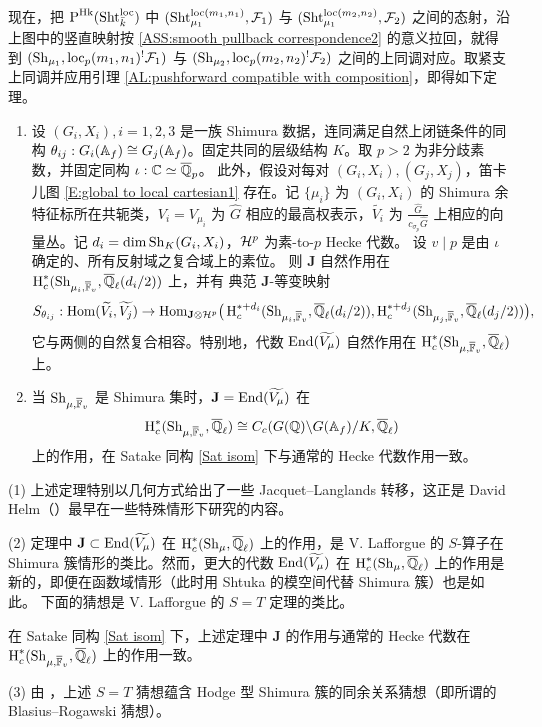 现在，把 $\operatorname{P}^{{\operatorname{Hk}}}(\operatorname{Sht}_{\bar k}^{\mathrm{loc}})$ 中 $(\operatorname{Sht}_{\mu_1}^{\mathrm{loc}(m_1,n_1)},{\mathcal F}_1)$ 与 $(\operatorname{Sht}_{\mu_1}^{\mathrm{loc}(m_2,n_2)},{\mathcal F}_2)$ 之间的态射，沿上图中的竖直映射按 \eqref{ASS:smooth pullback correspondence2} 的意义拉回，就得到 $(\operatorname{Sh}_{\mu_1}, \mathrm{loc}_p(m_1,n_1)^!{\mathcal F}_1)$ 与 $(\operatorname{Sh}_{\mu_2},\mathrm{loc}_p(m_2,n_2)^!{\mathcal F}_2)$ 之间的上同调对应。取紧支上同调并应用引理 \ref{AL:pushforward compatible with composition}，即得如下定理。
\begin{thm}
\label{introT: spectral action}
\begin{enumerate}
\item
设 $(G_i,X_i), i=1,2,3$ 是一族 Shimura 数据，连同满足自然上闭链条件的同构 $\theta_{ij}:G_i({\mathbb A}_f)\cong G_{j}({\mathbb A}_f)$。固定共同的层级结构 $K$。取 $p>2$ 为非分歧素数，并固定同构 $\iota: {\mathbb C}\simeq \overline{{\mathbb Q}}_p$。
此外，假设对每对 $(G_i,X_i),(G_j,X_j)$，笛卡儿图 \eqref{E:global to local cartesian1} 存在。记 $\{\mu_i\}$ 为 $(G_i,X_i)$ 的 Shimura 余特征标所在共轭类，$V_i=V_{\mu_i}$ 为 $\hat G$ 相应的最高权表示，$\widetilde{V_i}$ 为 $\frac{\hat G}{c_{\sigma_p}\hat G}$ 上相应的向量丛。记 $d_i=\dim \operatorname{Sh}_K(G_i,X_i)$，${\mathcal H}^p$ 为素-to-$p$ Hecke 代数。
设 $v\mid p$ 是由 $\iota$ 确定的、所有反射域之复合域上的素位。
则 $\mathbf J$ 自然作用在 $\operatorname{H}^*_c(\operatorname{Sh}_{\mu_i,\overline{{\mathbb F}}_v},{\overline{{\mathbb Q}}_\ell}(d_i/2))$ 上，并有
典范 $\mathbf J$-等变映射
\[S_{\theta_{ij}}:{\operatorname{Hom}}(\widetilde{V_i},\widetilde{V_j})\to {\operatorname{Hom}}_{\mathbf J\otimes{\mathcal H}^p}\big(\operatorname{H}_c^{*+d_i}(\operatorname{Sh}_{\mu_i,\overline{{\mathbb F}}_v},{\overline{{\mathbb Q}}_\ell}(d_i/2)),\operatorname{H}_c^{*+d_j}(\operatorname{Sh}_{\mu_j,\overline{{\mathbb F}}_v},{\overline{{\mathbb Q}}_\ell}(d_j/2))\big),\]
它与两侧的自然复合相容。特别地，代数 ${\operatorname{End}}(\widetilde{V_{\mu}})$ 自然作用在 $\operatorname{H}_c^{*}(\operatorname{Sh}_{\mu, \overline {\mathbb{F}}_v},{\overline{{\mathbb Q}}_\ell})$ 上。

\item 当 $\operatorname{Sh}_{\mu,\overline {\mathbb{F}}_v}$ 是 Shimura 集时，$\mathbf J={\operatorname{End}}(\widetilde{V_{\mu}})$ 在
$$\operatorname{H}_c^{*}(\operatorname{Sh}_{\mu, \overline {\mathbb{F}}_v},{\overline{{\mathbb Q}}_\ell})\cong C_c(G({\mathbb Q})\backslash G({\mathbb A}_f)/K, {\overline{{\mathbb Q}}_\ell})$$
上的作用，在 Satake 同构 \eqref{Sat isom} 下与通常的 Hecke 代数作用一致。
\end{enumerate}
\end{thm}

\begin{rmk}
(1) 上述定理特别以几何方式给出了一些 Jacquet–Langlands 转移，这正是 David Helm（\cite{He}）最早在一些特殊情形下研究的内容。

(2) 定理中 $\mathbf J\subset {\operatorname{End}}(\widetilde{V_{\mu}})$ 在 $\operatorname{H}_c^{*}(\operatorname{Sh}_{\mu},{\overline{{\mathbb Q}}_\ell})$ 上的作用，是 V. Lafforgue 的 $S$-算子在 Shimura 簇情形的类比。然而，更大的代数 ${\operatorname{End}}(\widetilde{V_{\mu}})$ 在 $\operatorname{H}_c^{*}(\operatorname{Sh}_{\mu},{\overline{{\mathbb Q}}_\ell})$ 上的作用是新的，即便在函数域情形（此时用 Shtuka 的模空间代替 Shimura 簇）也是如此。
下面的猜想是 V. Lafforgue 的 $S=T$ 定理的类比。
\begin{conjecture}
\label{introconj: S=T}
在 Satake 同构 \eqref{Sat isom} 下，上述定理中 $\mathbf J$ 的作用与通常的 Hecke 代数在 $\operatorname{H}_c^{*}(\operatorname{Sh}_{\mu, \overline {\mathbb{F}}_v},{\overline{{\mathbb Q}}_\ell})$ 上的作用一致。
\end{conjecture}

(3) 由 \cite[\S 6.3]{XZ2}，上述 $S=T$ 猜想蕴含 Hodge 型 Shimura 簇的同余关系猜想（即所谓的 Blasius–Rogawski 猜想）。
\end{rmk}

